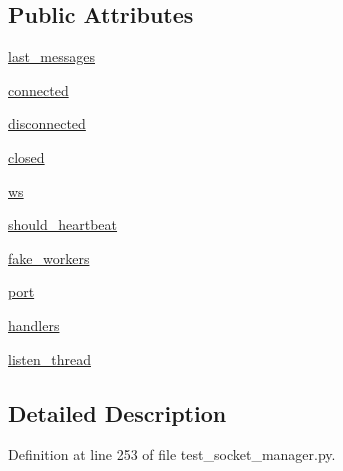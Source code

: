 \subsection*{Public Attributes}
\begin{DoxyCompactItemize}
\item 
\hyperlink{classparlai_1_1mturk_1_1core_1_1legacy__2018_1_1test_1_1test__socket__manager_1_1MockSocket_a1d5e7384dfc012697289b7de69ca5f40}{last\+\_\+messages}
\item 
\hyperlink{classparlai_1_1mturk_1_1core_1_1legacy__2018_1_1test_1_1test__socket__manager_1_1MockSocket_a0f58089c10c365e456a381de5b5d5a27}{connected}
\item 
\hyperlink{classparlai_1_1mturk_1_1core_1_1legacy__2018_1_1test_1_1test__socket__manager_1_1MockSocket_a55a243647ce7e5307e0df97b8279b471}{disconnected}
\item 
\hyperlink{classparlai_1_1mturk_1_1core_1_1legacy__2018_1_1test_1_1test__socket__manager_1_1MockSocket_a63b985c345fee8fa14cd8bdf688fe20b}{closed}
\item 
\hyperlink{classparlai_1_1mturk_1_1core_1_1legacy__2018_1_1test_1_1test__socket__manager_1_1MockSocket_a11f2c298092c1846ec5a2a8ded7c7e9c}{ws}
\item 
\hyperlink{classparlai_1_1mturk_1_1core_1_1legacy__2018_1_1test_1_1test__socket__manager_1_1MockSocket_ac88a4fa8e42513e99a8c0dc5d1292419}{should\+\_\+heartbeat}
\item 
\hyperlink{classparlai_1_1mturk_1_1core_1_1legacy__2018_1_1test_1_1test__socket__manager_1_1MockSocket_af2d58b3f57ca49c7020180afca9f22f5}{fake\+\_\+workers}
\item 
\hyperlink{classparlai_1_1mturk_1_1core_1_1legacy__2018_1_1test_1_1test__socket__manager_1_1MockSocket_afecbb453d4910a0851f6d35fe34d07a4}{port}
\item 
\hyperlink{classparlai_1_1mturk_1_1core_1_1legacy__2018_1_1test_1_1test__socket__manager_1_1MockSocket_a6564079a240413e618f9074b1864e905}{handlers}
\item 
\hyperlink{classparlai_1_1mturk_1_1core_1_1legacy__2018_1_1test_1_1test__socket__manager_1_1MockSocket_a9ebea6ec703fb3cc62c70e7d51dabb51}{listen\+\_\+thread}
\end{DoxyCompactItemize}


\subsection{Detailed Description}


Definition at line 253 of file test\+\_\+socket\+\_\+manager.\+py.



